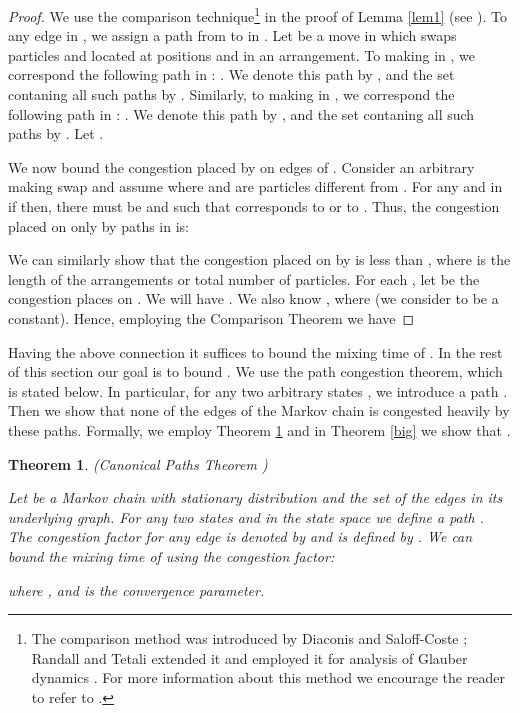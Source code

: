 \documentclass[10 pt]{article}
\newtheorem{thm}{Theorem}[section]
\begin{document}
\begin{proof}

We use the comparison technique\footnote{
The comparison method was introduced by Diaconis and Saloff-Coste \cite{ComparisonMethodDiaconis}; Randall and Tetali extended it and employed
it for analysis of Glauber dynamics \cite{compare}.  For more information about this method we encourage the reader to refer to \cite{MCBook}.
}
 in the proof of Lemma \ref{lem1} (see \cite{ComparisonMethodDiaconis, compare}). To any edge  in , we assign a path
from  to  in .  Let  be a move in  which swaps particles  and  located at positions
 and  in an arrangement. To   making  in , we correspond the following path in :
. We denote this path by ,
and the set contaning all such paths by  . 
Similarly, to   making  in , we correspond the following path in :
. We denote this path by , and the set contaning all such
paths by . Let .


We now bound the congestion placed by  on edges of .
Consider an arbitrary   making swap  and assume  where  and
 are particles different from . For any  and  in  if  then,
there must be   and  such that  corresponds to  or
to . Thus, the congestion placed on  only by paths in  is:





We can similarly show that the congestion placed on  by  is less than , where  is the length of the
arrangements or total number of particles. For each , let  be the congestion  places on .
We will have .  We also know , where  (we consider 
to be a constant). Hence, employing the Comparison Theorem we have


\end{proof}

Having the above connection it suffices to bound the mixing time of . In the rest of this section our goal is to bound
. We use the path congestion theorem, which is stated below.  In particular,
for any two arbitrary states ,  we introduce a path .
Then we show that none of the edges of the Markov chain  is congested heavily by these paths.
Formally, we employ Theorem \ref{canonicalPaths} and in Theorem \ref{big} we show that .

\newpage
\begin{thm}(Canonical Paths Theorem \cite{Permanent})\label{canonicalPaths}

Let  be a Markov chain with stationary distribution  and   the set of the edges in its underlying graph. 
For any two states  and  in the state space  we define a path .
The congestion factor for any edge  is denoted by  and is defined by
 . We can bound the mixing time of  using the congestion factor:

where ,  and  is the convergence parameter. 
\end{thm}
\end{document}
